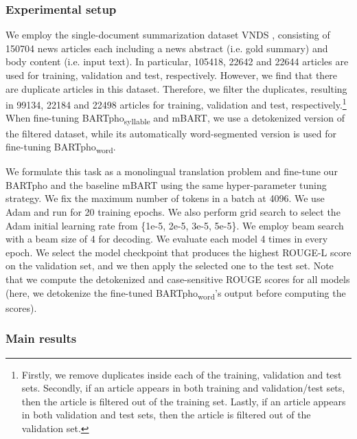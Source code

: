 \documentclass[a4paper]{article}
\begin{document}
\subsubsection{Experimental setup}\label{ssec:setup}

We employ the single-document summarization dataset VNDS  \cite{9023886}, consisting of 150704 news articles each including a news abstract (i.e. gold summary) and body content (i.e. input text). In particular, 105418, 22642 and 22644 articles are used for training, validation and test, respectively. However, we find that there are duplicate articles in this dataset. Therefore, we filter the duplicates, resulting in 99134, 22184 and 22498 articles for training, validation and test, respectively.\footnote{Firstly, we remove duplicates inside each of the training, validation and test sets. Secondly, if an article appears in both training and validation/test sets, then the article is filtered out of the training set. Lastly, if an article appears in both validation and test sets, then the article is filtered out of the validation set.} When fine-tuning BARTpho\textsubscript{syllable} and mBART, we use a detokenized version of the filtered dataset, while its automatically word-segmented version is used for fine-tuning BARTpho\textsubscript{word}. 

We formulate this task as a monolingual translation problem and fine-tune our BARTpho and the baseline mBART using the same hyper-parameter tuning strategy. We fix the maximum number of tokens in a batch at 4096. We use Adam and run for 20 training epochs.  We also perform grid search to select the Adam initial learning rate from \{1e-5, 2e-5, 3e-5, 5e-5\}. We employ beam search with a beam size of 4 for decoding. We evaluate each model 4 times in every epoch. We select the model checkpoint that produces the highest ROUGE-L score \cite{lin-2004-rouge} on the validation set, and we then apply the selected one to the test set. Note that we compute the detokenized and case-sensitive ROUGE scores for all models (here, we detokenize the fine-tuned BARTpho\textsubscript{word}'s output before computing the scores).





\subsubsection{Main results}
\end{document}
